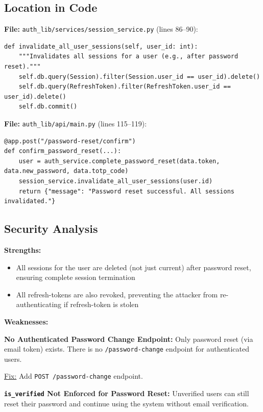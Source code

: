 \documentclass[11pt,a4paper]{article}
\begin{document}
\subsection{Location in Code}

\textbf{File:} \texttt{auth\_lib/services/session\_service.py} (lines 86--90):
\begin{lstlisting}
def invalidate_all_user_sessions(self, user_id: int):
    """Invalidates all sessions for a user (e.g., after password reset)."""
    self.db.query(Session).filter(Session.user_id == user_id).delete()
    self.db.query(RefreshToken).filter(RefreshToken.user_id == user_id).delete()
    self.db.commit()
\end{lstlisting}

\textbf{File:} \texttt{auth\_lib/api/main.py} (lines 115--119):
\begin{lstlisting}
@app.post("/password-reset/confirm")
def confirm_password_reset(...):
    user = auth_service.complete_password_reset(data.token, data.new_password, data.totp_code)
    session_service.invalidate_all_user_sessions(user.id)
    return {"message": "Password reset successful. All sessions invalidated."}
\end{lstlisting}

\subsection{Security Analysis}

\textbf{Strengths:}
\begin{itemize}[noitemsep]
    \item All sessions for the user are deleted (not just current) after password reset, ensuring complete session termination
    \item All refresh-tokens are also revoked, preventing the attacker from re-authenticating if refresh-token is stolen
\end{itemize}

\textbf{Weaknesses:}

\textbf{No Authenticated Password Change Endpoint:} Only password reset (via email token) exists. There is no \texttt{/password-change} endpoint for authenticated users.

\underline{Fix:} Add \texttt{POST /password-change} endpoint.

\textbf{\texttt{is\_verified} Not Enforced for Password Reset:} Unverified users can still reset their password and continue using the system without email verification.
\end{document}
